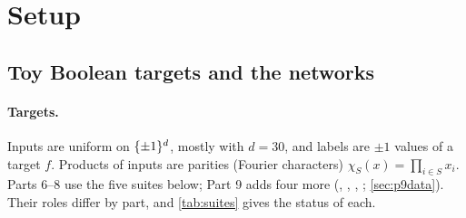 \section{Setup}\label{sec:setup}

\subsection{Toy Boolean targets and the networks}\label{sec:toysetup}

\paragraph{Targets.} Inputs are uniform on $\{\pm1\}^d$, mostly with $d=30$, and labels are $\pm1$ values of a target $f$. Products of inputs are parities (Fourier characters) $\chi_S(x)=\prod_{i\in S}x_i$. Parts 6--8 use the five suites below; Part 9 adds four more (, , , ; \cref{sec:p9data}). Their roles differ by part, and \cref{tab:suites} gives the status of each.
